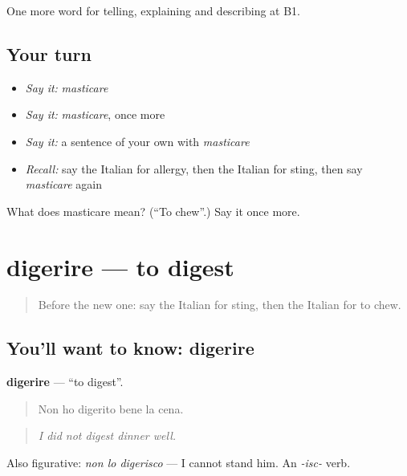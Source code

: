 \begin{grammarlens}[title={What you've built}]
One more word for telling, explaining and describing at B1.
\end{grammarlens}

\subsection*{Your turn}
\begin{itemize}
\raggedright
  \item \emph{Say it:} \emph{masticare}
  \item \emph{Say it:} \emph{masticare}, once more
  \item \emph{Say it:} a sentence of your own with \emph{masticare}
  \item \emph{Recall:} say the Italian for allergy, then the Italian for sting, then say \emph{masticare} again
\end{itemize}

\begin{tcolorbox}[breakable,colback=teal!4,colframe=teal!35!black,title={Before you move on}]
What does masticare mean? (\textquotedblleft{}To chew\textquotedblright{}.) Say it once more.
\end{tcolorbox}
\section[digerire]{digerire — to digest}

\label{lesson:IT-C487-digerire}



\begin{quote}
Before the new one: say the Italian for sting, then the Italian for to chew.
\end{quote}

\subsection*{You'll want to know: digerire}
\textbf{digerire} — \textquotedblleft{}to digest\textquotedblright{}.

\begin{quote}
Non ho digerito bene la cena.
\end{quote}

\begin{quote}
\emph{I did not digest dinner well.}
\end{quote}

Also figurative: \emph{non lo digerisco} — I cannot stand him. An \emph{-isc-} verb.

